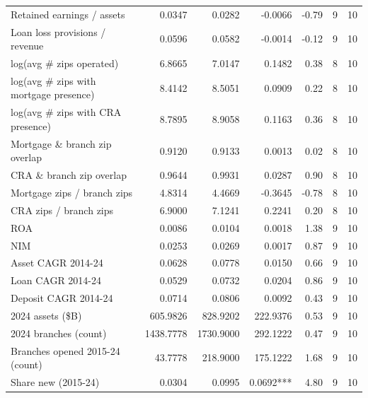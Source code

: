 \begin{tabular}{lrrrrrr}
Retained earnings / assets & 0.0347 & 0.0282 & -0.0066 & -0.79 & 9 & 10 \\
Loan loss provisions / revenue & 0.0596 & 0.0582 & -0.0014 & -0.12 & 9 & 10 \\
log(avg \# zips operated) & 6.8665 & 7.0147 & 0.1482 & 0.38 & 8 & 10 \\
log(avg \# zips with mortgage presence) & 8.4142 & 8.5051 & 0.0909 & 0.22 & 8 & 10 \\
log(avg \# zips with CRA presence) & 8.7895 & 8.9058 & 0.1163 & 0.36 & 8 & 10 \\
Mortgage \& branch zip overlap & 0.9120 & 0.9133 & 0.0013 & 0.02 & 8 & 10 \\
CRA \& branch zip overlap & 0.9644 & 0.9931 & 0.0287 & 0.90 & 8 & 10 \\
Mortgage zips / branch zips & 4.8314 & 4.4669 & -0.3645 & -0.78 & 8 & 10 \\
CRA zips / branch zips & 6.9000 & 7.1241 & 0.2241 & 0.20 & 8 & 10 \\
ROA & 0.0086 & 0.0104 & 0.0018 & 1.38 & 9 & 10 \\
NIM & 0.0253 & 0.0269 & 0.0017 & 0.87 & 9 & 10 \\
Asset CAGR 2014-24 & 0.0628 & 0.0778 & 0.0150 & 0.66 & 9 & 10 \\
Loan CAGR 2014-24 & 0.0529 & 0.0732 & 0.0204 & 0.86 & 9 & 10 \\
Deposit CAGR 2014-24 & 0.0714 & 0.0806 & 0.0092 & 0.43 & 9 & 10 \\
2024 assets (\$B) & 605.9826 & 828.9202 & 222.9376 & 0.53 & 9 & 10 \\
2024 branches (count) & 1438.7778 & 1730.9000 & 292.1222 & 0.47 & 9 & 10 \\
Branches opened 2015-24 (count) & 43.7778 & 218.9000 & 175.1222 & 1.68 & 9 & 10 \\
Share new (2015-24) & 0.0304 & 0.0995 & 0.0692*** & 4.80 & 9 & 10 \\
\bottomrule
\end{tabular}

